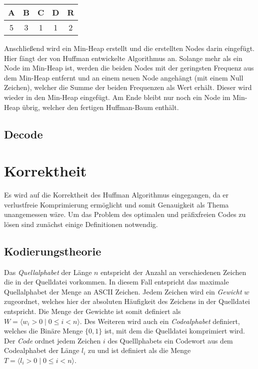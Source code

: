 \documentclass[course=erap]{aspdoc}
\begin{document}
\begin{center}
    \begin{tabular}{ |c|c|c|c|c| } 
     \hline
     A & B & C & D & R \\ 
     \hline
     5 & 3 & 1 & 1 & 2 \\ 
     \hline
    \end{tabular}
\end{center}

Anschließend wird ein Min-Heap erstellt und die erstellten Nodes darin eingefügt. Hier fängt der von Huffman entwickelte Algorithmus an. \cite{10.1145/3342555}
Solange mehr als ein Node im Min-Heap ist, werden die beiden Nodes mit der geringsten Frequenz aus dem Min-Heap entfernt und an einem neuen Node angehängt (mit einem Null Zeichen), welcher die Summe der beiden Frequenzen als Wert erhält. Dieser wird wieder in den Min-Heap eingefügt.
Am Ende bleibt nur noch ein Node im Min-Heap übrig, welcher den fertigen Huffman-Baum enthält.

\subsection{Decode}

\section{Korrektheit}

Es wird auf die Korrektheit des Huffman Algorithmus eingegangen, da er verlustfreie Komprimierung ermöglicht und somit Genauigkeit als Thema unangemessen wäre.
Um das Problem des optimalen und präfixfreien Codes zu lösen sind zunächst einige Definitionen notwendig.

\subsection{Kodierungstheorie}

Das \textit{Quellalphabet} der Länge $n$ entspricht der Anzahl an verschiedenen Zeichen die in der Quelldatei vorkommen. In diesem Fall entspricht das maximale Quellalphabet der Menge an ASCII Zeichen.
Jedem Zeichen wird ein \textit{Gewicht} $w$ zugeordnet, welches hier der absoluten Häufigkeit des Zeichens in der Quelldatei entspricht. Die Menge der Gewichte ist somit definiert als $W = \langle w_i > 0 \mid 0 \le i < n \rangle $.
Des Weiteren wird auch ein \textit{Codealphabet} definiert, welches die Binäre Menge $\lbrace0, 1\rbrace$ ist, mit dem die Quelldatei komprimiert wird.
Der \textit{Code} ordnet jedem Zeichen $i$ des Quelllphabets ein Codewort aus dem Codealphabet der Länge $l_i$ zu und ist definiert als die Menge $T = \langle l_i > 0 \mid 0 \le i < n \rangle$.
\end{document}
